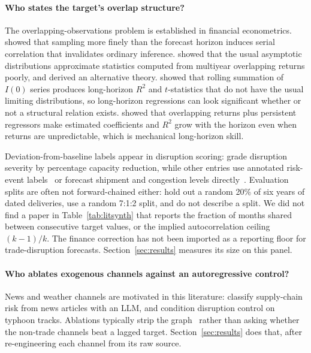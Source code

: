 \documentclass[10pt]{article}
\begin{document}
\paragraph{Who states the target's overlap structure?}
The overlapping-observations problem is established in financial econometrics. \citet{ref29} showed that sampling more finely than the forecast horizon induces serial correlation that invalidates ordinary inference. \citet{ref30} showed that the usual asymptotic distributions approximate statistics computed from multiyear overlapping returns poorly, and derived an alternative theory. \citet{ref31} showed that rolling summation of $I(0)$ series produces long-horizon $R^2$ and $t$-statistics that do not have the usual limiting distributions, so long-horizon regressions can look significant whether or not a structural relation exists. \citet{ref32} showed that overlapping returns plus persistent regressors make estimated coefficients and $R^2$ grow with the horizon even when returns are unpredictable, which is mechanical long-horizon skill.

Deviation-from-baseline labels appear in disruption scoring: \citet{ref23} grade disruption severity by percentage capacity reduction, while other entries use annotated risk-event labels~\citep{ref7} or forecast shipment and congestion levels directly~\citep{ref17}. Evaluation splits are often not forward-chained either: \citet{ref35} hold out a random 20\% of six years of dated deliveries, \citet{ref16} use a random 7:1:2 split, and \citet{ref36} do not describe a split. We did not find a paper in Table~\ref{tab:litsynth} that reports the fraction of months shared between consecutive target values, or the implied autocorrelation ceiling $(k-1)/k$. The finance correction has not been imported as a reporting floor for trade-disruption forecasts. Section~\ref{sec:results} measures its size on this panel.

\paragraph{Who ablates exogenous channels against an autoregressive control?}
News and weather channels are motivated in this literature: \citet{ref21} classify supply-chain risk from news articles with an LLM, and \citet{ref17} condition disruption control on typhoon tracks. Ablations typically strip the graph~\citep{ref5,ref7} rather than asking whether the non-trade channels beat a lagged target. Section~\ref{sec:results} does that, after re-engineering each channel from its raw source.
\end{document}
